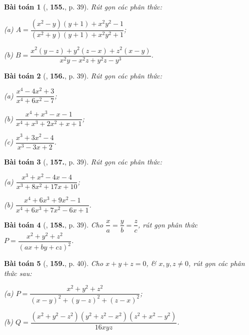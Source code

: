\documentclass{article}
\numberwithin{equation}{section}
\newtheorem{baitoan}{Bài toán}[section]
\begin{document}
\begin{baitoan}[\cite{Tuyen_Toan_8}, \textbf{155.}, p. 39]
	Rút gọn các phân thức:
	
	\begin{enumerate*}
		\item[(a)] $A = \dfrac{(x^2 - y)(y + 1) + x^2y^2 - 1}{(x^2 + y)(y + 1) + x^2y^2 + 1}$;
		\item[(b)] $B = \dfrac{x^2(y - z) + y^2(z - x) + z^2(x - y)}{x^2y - x^2z + y^2z - y^3}$.
	\end{enumerate*}
\end{baitoan}

\begin{baitoan}[\cite{Tuyen_Toan_8}, \textbf{156.}, p. 39]
	Rút gọn các phân thức:
	\begin{enumerate*}
		\item[(a)] $\dfrac{x^4 - 4x^2 + 3}{x^4 + 6x^2 - 7}$;
		\item[(b)] $\dfrac{x^4 + x^3 - x - 1}{x^4 + x^3 + 2x^2 + x + 1}$;
		\item[(c)] $\dfrac{x^3 + 3x^2 - 4}{x^3 - 3x + 2}$.
	\end{enumerate*}
\end{baitoan}

\begin{baitoan}[\cite{Tuyen_Toan_8}, \textbf{157.}, p. 39]
	Rút gọn các phân thức:
	\begin{enumerate*}
		\item[(a)] $\dfrac{x^3 + x^2 - 4x - 4}{x^3 + 8x^2 + 17x + 10}$;
		\item[(b)] $\dfrac{x^4 + 6x^3 + 9x^2 - 1}{x^4 + 6x^3 + 7x^2 - 6x + 1}$.
	\end{enumerate*}
\end{baitoan}

\begin{baitoan}[\cite{Tuyen_Toan_8}, \textbf{158.}, p. 39]
	Cho $\dfrac{x}{a} = \dfrac{y}{b} = \dfrac{z}{c}$, rút gọn phân thức $P = \dfrac{x^2 + y^2 + z^2}{(ax + by + cz)^2}$.
\end{baitoan}

\begin{baitoan}[\cite{Tuyen_Toan_8}, \textbf{159.}, p. 40]
	Cho $x + y + z = 0$, \& $x,y,z\ne 0$, rút gọn các phân thức sau:
	
	\begin{enumerate*}
		\item[(a)] $P = \dfrac{x^2 + y^2 + z^2}{(x - y)^2 + (y - z)^2 + (z - x)^2}$;
		\item[(b)] $Q = \dfrac{(x^2 + y^2 - z^2)(y^2 + z^2 - x^2)(z^2 + x^2 - y^2)}{16xyz}$.
	\end{enumerate*}
\end{baitoan}
\end{document}

